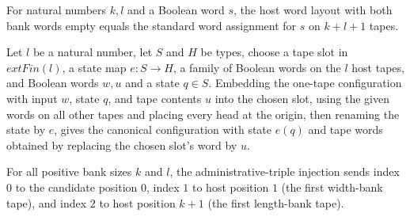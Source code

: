 \begin{lemma}
\label{Turing.FinTM.emitterP2_words_clean}
\leanok
{}
For natural numbers $k,l$ and a Boolean word $s$, the host word layout with both bank
words empty equals the standard word assignment for $s$ on $k+l+1$ tapes.
\end{lemma}

\begin{lemma}
\label{Turing.FinTM.emitterP2_one_frame}
\leanok
{}
Let $l$ be a natural number, let $S$ and $H$ be types, choose a tape slot in
$	ext{Fin}(l)$, a state map $e:S\to H$, a family of Boolean words on the $l$ host tapes,
and Boolean words $w,u$ and a state $q\in S$. Embedding the one-tape configuration with
input $w$, state $q$, and tape contents $u$ into the chosen slot, using the given words
on all other tapes and placing every head at the origin, then renaming the state by $e$,
gives the canonical configuration with state $e(q)$ and tape words obtained by replacing
the chosen slot's word by $u$.
\end{lemma}

\begin{definition}
\label{Turing.FinTM.emitterP2SmallIndex}
\leanok
{}
For all positive bank sizes $k$ and $l$, the administrative-triple injection
sends index $0$ to the candidate position $0$, index $1$ to host position
$1$ (the first width-bank tape), and index $2$ to host position $k + 1$ (the
first length-bank tape).
\end{definition}

